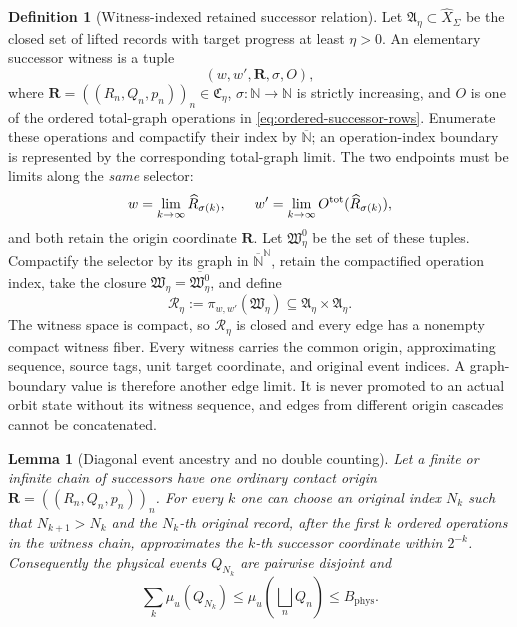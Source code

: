 \documentclass[11pt]{article}
\numberwithin{section}{part}
\theoremstyle{plain}
\newtheorem{lemma}[lemma]{Lemma}
\theoremstyle{definition}
\newtheorem{definition}[definition]{Definition}
\theoremstyle{remark}
\newcommand{\Phys}{\mathrm{phys}}
\newcommand{\Budget}{B_{\Phys}}
\begin{document}
\begin{definition}[Witness-indexed retained successor relation]
\label{def:retained-successor-relation}
Let \(\mathfrak A_\eta\subset\widehat X_\Sigma\) be the closed set of lifted
records with target progress at least \(\eta>0\).  An elementary successor
witness is a tuple
\begin{equation}
 \label{eq:elementary-successor-witness}
 (w,w',\mathbf R,\sigma,O),
\end{equation}
where \(\mathbf R=((R_n,Q_n,p_n))_n\in\mathfrak C_\eta\),
\(\sigma:\mathbb N\to\mathbb N\) is strictly increasing, and \(O\) is one
of the ordered total-graph operations in
\eqref{eq:ordered-successor-rows}.  Enumerate these operations and compactify
their index by \(\overline{\mathbb N}\); an operation-index boundary is
represented by the corresponding total-graph limit.  The two endpoints must be limits along
the \emph{same} selector:
\begin{equation}
 \label{eq:same-origin-successor-limits}
 w=\lim_{k\to\infty}\widehat R_{\sigma(k)},
 \qquad
 w'=\lim_{k\to\infty}O^{\rm tot}(\widehat R_{\sigma(k)}),
\end{equation}
and both retain the origin coordinate \(\mathbf R\).  Let
\(\mathfrak W_\eta^0\) be the set of these tuples.  Compactify the selector by
its graph in \(\overline{\mathbb N}^{\mathbb N}\), retain the compactified
operation index, take the closure
\(\mathfrak W_\eta=\overline{\mathfrak W_\eta^0}\), and define
\begin{equation}
 \label{eq:closed-retained-successor}
 \mathcal R_\eta:=\pi_{w,w'}(\mathfrak W_\eta)
 \subseteq\mathfrak A_\eta\times\mathfrak A_\eta.
\end{equation}
The witness space is compact, so \(\mathcal R_\eta\) is closed and every edge
has a nonempty compact witness fiber.  Every witness carries the common
origin, approximating sequence, source tags, unit target coordinate, and
original event indices.  A graph-boundary value is therefore another edge
limit.  It is never promoted to an actual orbit state without its witness
sequence, and edges from different origin cascades cannot be concatenated.
\end{definition}

\begin{lemma}[Diagonal event ancestry and no double counting]
\label{lem:successor-no-double-counting}
Let a finite or infinite chain of successors have one ordinary contact origin
\(\mathbf R=((R_n,Q_n,p_n))_n\).  For every \(k\) one can choose an original
index \(N_k\) such that \(N_{k+1}>N_k\) and the \(N_k\)-th original record,
after the first \(k\) ordered operations in the witness chain, approximates
the \(k\)-th successor coordinate within \(2^{-k}\).  Consequently the physical
events \(Q_{N_k}\) are pairwise disjoint and
\begin{equation}
 \label{eq:successor-no-double-counting}
 \sum_k\mu_u(Q_{N_k})\le\mu_u\!\left(\bigsqcup_nQ_n\right)
 \le\Budget.
\end{equation}
\end{lemma}
\end{document}
